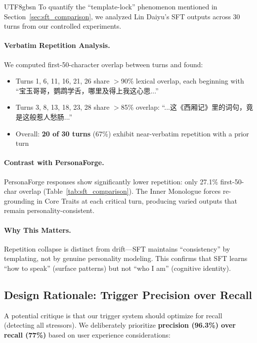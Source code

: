 \documentclass[11pt]{article}
\begin{document}
\begin{CJK*}{UTF8}{gbsn}
To quantify the ``template-lock'' phenomenon mentioned in Section~\ref{sec:sft_comparison}, we analyzed Lin Daiyu's SFT outputs across 30 turns from our controlled experiments.

\paragraph{Verbatim Repetition Analysis.} We computed first-50-character overlap between turns and found:
\begin{itemize}
    \item Turns 1, 6, 11, 16, 21, 26 share $>$90\% lexical overlap, each beginning with ``宝玉哥哥，鹦鹉学舌，哪里及得上我这心思...''
    \item Turns 3, 8, 13, 18, 23, 28 share $>$85\% overlap: ``...这《西厢记》里的词句，竟是这般惹人愁肠...''
    \item Overall: \textbf{20 of 30 turns} (67\%) exhibit near-verbatim repetition with a prior turn
\end{itemize}

\paragraph{Contrast with PersonaForge.} PersonaForge responses show significantly lower repetition: only 27.1\% first-50-char overlap (Table~\ref{tab:sft_comparison}). The Inner Monologue forces re-grounding in Core Traits at each critical turn, producing varied outputs that remain personality-consistent.

\paragraph{Why This Matters.} Repetition collapse is distinct from drift---SFT maintains ``consistency'' by templating, not by genuine personality modeling. This confirms that SFT learns ``how to speak'' (surface patterns) but not ``who I am'' (cognitive identity).

\subsection{Design Rationale: Trigger Precision over Recall}
\label{sec:trigger_rationale}

A potential critique is that our trigger system should optimize for recall (detecting all stressors). We deliberately prioritize \textbf{precision (96.3\%) over recall (77\%)} based on user experience considerations:


\end{CJK*}
\end{document}
